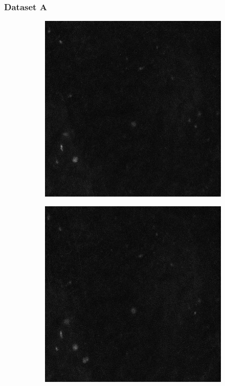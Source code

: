 	\subsubsection{Dataset A}
	\begin{figure}[h]
   		\begin{subfigure}{.32\textwidth}
   		\includegraphics[width=\textwidth]{images/series30green019}
   		\end{subfigure}%
   		\hfill
   		\begin{subfigure}{.32\textwidth}
   		\includegraphics[width=\textwidth]{images/series30green020}

\end{subfigure}
\end{figure}
